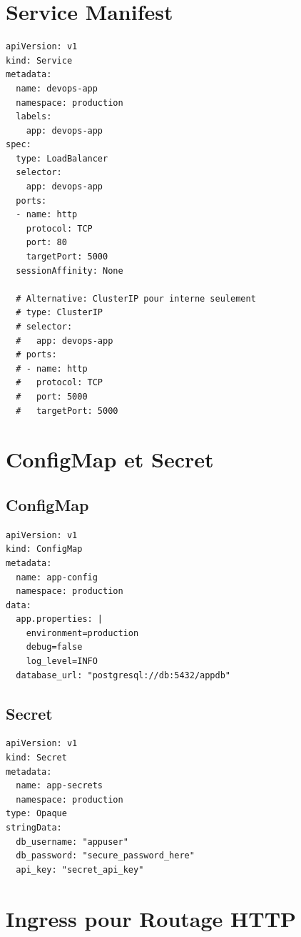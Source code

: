 \documentclass[12pt,a4paper]{report}
\begin{document}
\section{Service Manifest}

\lstset{language=yaml}
\begin{lstlisting}
apiVersion: v1
kind: Service
metadata:
  name: devops-app
  namespace: production
  labels:
    app: devops-app
spec:
  type: LoadBalancer
  selector:
    app: devops-app
  ports:
  - name: http
    protocol: TCP
    port: 80
    targetPort: 5000
  sessionAffinity: None
  
  # Alternative: ClusterIP pour interne seulement
  # type: ClusterIP
  # selector:
  #   app: devops-app
  # ports:
  # - name: http
  #   protocol: TCP
  #   port: 5000
  #   targetPort: 5000
\end{lstlisting}

\section{ConfigMap et Secret}

\subsection{ConfigMap}

\lstset{language=yaml}
\begin{lstlisting}
apiVersion: v1
kind: ConfigMap
metadata:
  name: app-config
  namespace: production
data:
  app.properties: |
    environment=production
    debug=false
    log_level=INFO
  database_url: "postgresql://db:5432/appdb"
\end{lstlisting}

\subsection{Secret}

\lstset{language=yaml}
\begin{lstlisting}
apiVersion: v1
kind: Secret
metadata:
  name: app-secrets
  namespace: production
type: Opaque
stringData:
  db_username: "appuser"
  db_password: "secure_password_here"
  api_key: "secret_api_key"
\end{lstlisting}

\section{Ingress pour Routage HTTP}
\end{document}
